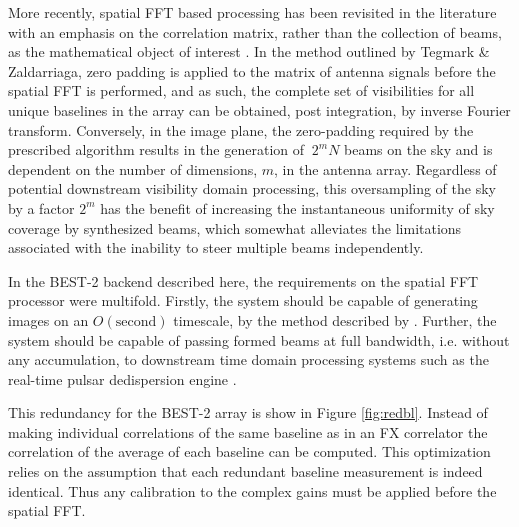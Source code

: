 \documentclass[useAMS,macros,usenatbib,onecolumn]{mn2e}
\begin{document}
More recently, spatial FFT based processing has been revisited in the literature with an emphasis on the correlation matrix, rather than the collection of beams, as the mathematical object of interest \citep{fftt} \citep{omniscope}.
In the method outlined by Tegmark \& Zaldarriaga, zero padding is applied to the matrix of antenna signals before the spatial FFT is performed, and as such, the complete set of visibilities for all unique baselines in the array can be obtained, post integration, by inverse Fourier transform.
Conversely, in the image plane, the zero-padding required by the prescribed algorithm results in the generation of $~2^{m}N$ beams on the sky and is dependent on the number of dimensions, $m$, in the antenna array.
Regardless of potential downstream visibility domain processing, this oversampling of the sky by a factor $2^{m}$ has the benefit of increasing the instantaneous uniformity of sky coverage by synthesized beams, which somewhat alleviates the limitations associated with the inability to steer multiple beams independently.

In the BEST-2 backend described here, the requirements on the spatial FFT processor were multifold.
Firstly, the system should be capable of generating images on an $O(\mathrm{second})$ timescale, by the method described by \citep{fftt}.
Further, the system should be capable of passing formed beams at full bandwidth, i.e. without any accumulation, to downstream time domain processing systems such as the real-time pulsar dedispersion engine \citep{dedispersion}. 

This redundancy for the BEST-2 array is show in Figure \ref{fig:redbl}.
Instead of making individual correlations of the same baseline as in an FX correlator the correlation of the average of each baseline can be computed.
This optimization relies on the assumption that each redundant baseline measurement is indeed identical.
Thus any calibration to the complex gains must be applied before the spatial FFT.
\end{document}
